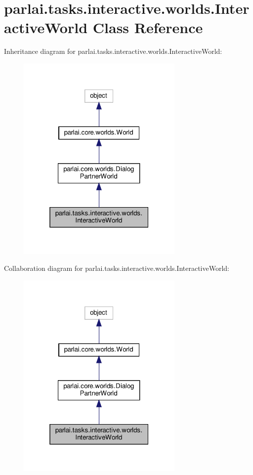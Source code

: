 \hypertarget{classparlai_1_1tasks_1_1interactive_1_1worlds_1_1InteractiveWorld}{}\section{parlai.\+tasks.\+interactive.\+worlds.\+Interactive\+World Class Reference}
\label{classparlai_1_1tasks_1_1interactive_1_1worlds_1_1InteractiveWorld}


Inheritance diagram for parlai.\+tasks.\+interactive.\+worlds.\+Interactive\+World\+:
\nopagebreak
\begin{figure}[H]
\begin{center}
\leavevmode
\includegraphics[width=229pt]{classparlai_1_1tasks_1_1interactive_1_1worlds_1_1InteractiveWorld__inherit__graph}
\end{center}
\end{figure}


Collaboration diagram for parlai.\+tasks.\+interactive.\+worlds.\+Interactive\+World\+:
\nopagebreak
\begin{figure}[H]
\begin{center}
\leavevmode
\includegraphics[width=229pt]{classparlai_1_1tasks_1_1interactive_1_1worlds_1_1InteractiveWorld__coll__graph}
\end{center}
\end{figure}
